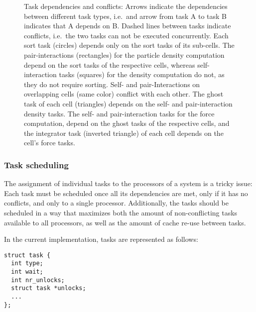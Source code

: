 \documentclass[final]{siamltex}
\begin{document}
\begin{figure}
    \centerline{}
    
    \caption{Task dependencies and conflicts:
        Arrows indicate the dependencies
        between different task types, i.e.~and arrow from task A to task
        B indicates that A depends on B.
        Dashed lines between tasks indicate conflicts, i.e.~the two tasks
        can not be executed concurrently.
        Each sort task (circles) depends
        only on the sort tasks of its sub-cells.
        The pair-interactions (rectangles) for the particle
        density computation depend on the sort tasks of the respective cells,
        whereas self-interaction tasks (squares) for the density computation
        do not, as they do not require sorting.
        Self- and pair-Interactions on overlapping cells (same color)
        conflict with each other.
        The ghost task of each cell (triangles) depends on the self-
        and pair-interaction density tasks.
        The self- and pair-interaction tasks for the force computation,
        depend on the ghost tasks of the respective cells,
        and the integrator task (inverted triangle) of each cell depends on the cell's
        force tasks.
        }
    \label{fig:Hierarchy2}
\end{figure}


\subsubsection{Task scheduling}

The assignment of individual tasks to the processors of a system
is a tricky issue:
Each task must be scheduled once all its dependencies are met,
only if it has no conflicts, and only to a single processor.
Additionally, the tasks should be scheduled in a way that
maximizes both the amount of non-conflicting tasks available to all
processors, as well as the amount of cache re-use between tasks.

In the current implementation, tasks are represented as follows:
        
\begin{center}\begin{minipage}{0.8\textwidth}
    \begin{lstlisting}
struct task {
  int type;
  int wait;
  int nr_unlocks;
  struct task *unlocks;
  ...
};
    \end{lstlisting}
\end{minipage}\end{center}
\end{document}
